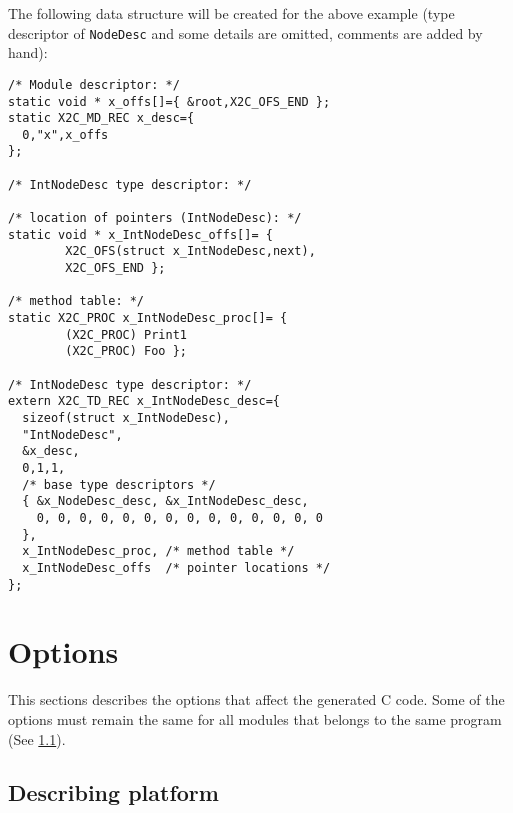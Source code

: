 The following data structure will be created for the above example
(type descriptor of {\tt NodeDesc} and some details
are omitted, comments are added by hand):
\begin{verbatim}
/* Module descriptor: */
static void * x_offs[]={ &root,X2C_OFS_END };
static X2C_MD_REC x_desc={
  0,"x",x_offs
};

/* IntNodeDesc type descriptor: */

/* location of pointers (IntNodeDesc): */
static void * x_IntNodeDesc_offs[]= {
        X2C_OFS(struct x_IntNodeDesc,next),
        X2C_OFS_END };

/* method table: */
static X2C_PROC x_IntNodeDesc_proc[]= {
        (X2C_PROC) Print1
        (X2C_PROC) Foo };

/* IntNodeDesc type descriptor: */
extern X2C_TD_REC x_IntNodeDesc_desc={
  sizeof(struct x_IntNodeDesc),
  "IntNodeDesc",
  &x_desc,
  0,1,1,
  /* base type descriptors */
  { &x_NodeDesc_desc, &x_IntNodeDesc_desc,
    0, 0, 0, 0, 0, 0, 0, 0, 0, 0, 0, 0, 0, 0
  },
  x_IntNodeDesc_proc, /* method table */
  x_IntNodeDesc_offs  /* pointer locations */
};
\end{verbatim}


\section{Options}

This sections describes the options that affect the generated
C code. Some of the options must remain the same for all modules
that belongs to the same program (See \ref{maptoc:opt:config}).

\subsection{Describing platform}\label{maptoc:opt:config}

